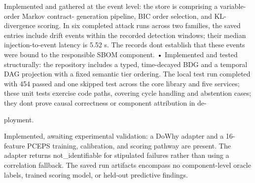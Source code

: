 \documentclass[conference]{IEEEtran}
\begin{document}
\par\noindent\textbullet{} Implemented and gathered at the event level: the store is comprising a variable-order Markov contract- generation pipeline, BIC order selection, and KL- divergence scoring. In six completed attack runs across two families, the saved entries include drift events within the recorded detection windows; their median injection-to-event latency is 5.52 s. The records don\textquotesingle t establish that these events were bound to the responsible SBOM component. • Implemented and tested structurally: the repository includes a typed, time-decayed BDG and a temporal DAG projection with a fixed semantic tier ordering. The local test run completed with 454 passed and one skipped test across the core library and five services; these unit tests exercise code paths, covering cycle handling and abstention cases; they don\textquotesingle t prove causal correctness or component attribution in de-

ployment.
\par\noindent\textbullet{} Implemented, awaiting experimental validation: a DoWhy adapter and a 16-feature PCEPS training, calibration, and scoring pathway are present. The adapter returns not\_identifiable for stipulated failures rather than using a correlation fallback. The saved run artifacts encompass no component-level oracle labels, trained scoring model, or held-out predictive findings.
\end{document}
